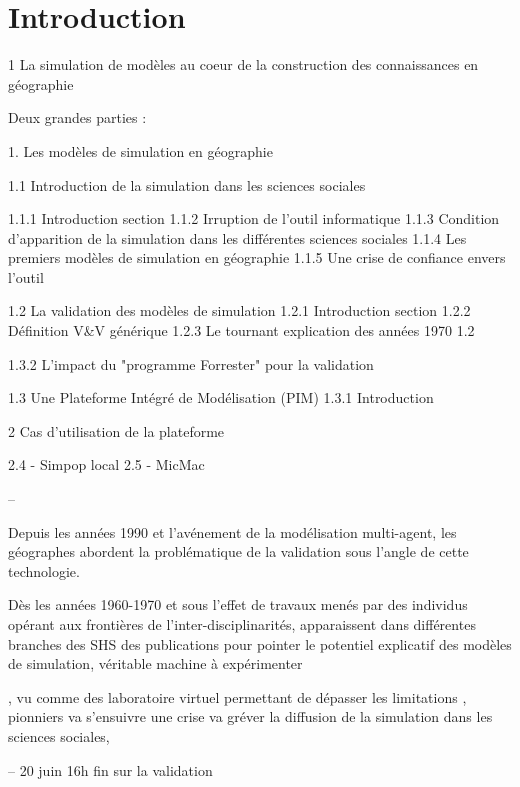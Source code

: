 
\chapter{Introduction}

\startcontents[chapters]
\Mprintcontents


1 La simulation de modèles au coeur de la construction des connaissances en géographie

Deux grandes parties : 

1. Les modèles de simulation en géographie

1.1 Introduction de la simulation dans les sciences sociales 
	
	1.1.1 Introduction section
	1.1.2 Irruption de l'outil informatique
	1.1.3 Condition d'apparition de la simulation dans les différentes sciences sociales
	1.1.4 Les premiers modèles de simulation en géographie
	1.1.5 Une crise de confiance envers l'outil

1.2 La validation des modèles de simulation
	1.2.1 Introduction section
	1.2.2 Définition V&V générique
	1.2.3 Le tournant explication des années 1970
	1.2
	
	1.3.2 L'impact du "programme Forrester" pour la validation

1.3 Une Plateforme Intégré de Modélisation (PIM)
	1.3.1 Introduction

2 Cas d'utilisation de la plateforme

2.4 - Simpop local
2.5 - MicMac 

--

Depuis les années 1990 et l'avénement de la modélisation multi-agent, les géographes abordent la problématique de la validation sous l'angle de cette technologie.

Dès les années 1960-1970 et sous l'effet de travaux menés par des individus opérant aux frontières de l'inter-disciplinarités, apparaissent dans différentes branches des SHS des publications pour pointer le potentiel explicatif des modèles de simulation, véritable machine à expérimenter 

,  vu comme des laboratoire virtuel permettant de dépasser les limitations  ,  pionniers va s'ensuivre une crise va gréver la diffusion de la simulation dans les sciences sociales, 

--
20 juin 16h fin sur la validation 


